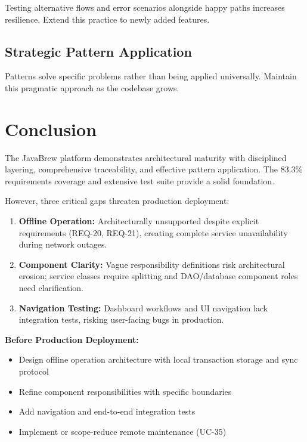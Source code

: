 \documentclass[11pt,a4paper]{article}
\begin{document}
Testing alternative flows and error scenarios alongside happy paths increases resilience. Extend this practice to newly added features.

\subsection{Strategic Pattern Application}

Patterns solve specific problems rather than being applied universally. Maintain this pragmatic approach as the codebase grows.

\section{Conclusion}

The JavaBrew platform demonstrates architectural maturity with disciplined layering, comprehensive traceability, and effective pattern application. The 83.3\% requirements coverage and extensive test suite provide a solid foundation.

However, three critical gaps threaten production deployment:

\begin{enumerate}
    \item \textbf{Offline Operation:} Architecturally unsupported despite explicit requirements (REQ-20, REQ-21), creating complete service unavailability during network outages.
    \item \textbf{Component Clarity:} Vague responsibility definitions risk architectural erosion; service classes require splitting and DAO/database component roles need clarification.
    \item \textbf{Navigation Testing:} Dashboard workflows and UI navigation lack integration tests, risking user-facing bugs in production.
\end{enumerate}

\textbf{Before Production Deployment:}
\begin{itemize}
    \item Design offline operation architecture with local transaction storage and sync protocol
    \item Refine component responsibilities with specific boundaries
    \item Add navigation and end-to-end integration tests
    \item Implement or scope-reduce remote maintenance (UC-35)
\end{itemize}
\end{document}
